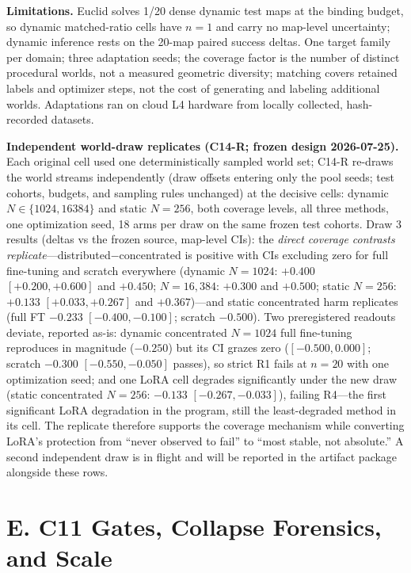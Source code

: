 \documentclass[letterpaper]{article} %
\newcommand{\stage}[1]{\textsc{#1}}
\begin{document}
\textbf{Limitations.} Euclid solves 1/20 dense dynamic test maps at the binding budget, so dynamic matched-ratio cells have $n{=}1$ and carry no map-level uncertainty; dynamic inference rests on the 20-map paired success deltas. One target family per domain; three adaptation seeds; the coverage factor is the number of distinct procedural worlds, not a measured geometric diversity; matching covers retained labels and optimizer steps, not the cost of generating and labeling additional worlds. Adaptations ran on cloud L4 hardware from locally collected, hash-recorded datasets.

\textbf{Independent world-draw replicates (C14-R; frozen design 2026-07-25).} Each original cell used one deterministically sampled world set; C14-R re-draws the world streams independently (draw offsets entering only the pool seeds; test cohorts, budgets, and sampling rules unchanged) at the decisive cells: dynamic $N \in \{1024, 16384\}$ and static $N{=}256$, both coverage levels, all three methods, one optimization seed, 18 arms per draw on the same frozen test cohorts. Draw 3 results (deltas vs the frozen source, map-level CIs): the \emph{direct coverage contrasts replicate}---distributed$-$concentrated is positive with CIs excluding zero for full fine-tuning and scratch everywhere (dynamic $N{=}1024$: $+0.400$ $[+0.200,+0.600]$ and $+0.450$; $N{=}16{,}384$: $+0.300$ and $+0.500$; static $N{=}256$: $+0.133$ $[+0.033,+0.267]$ and $+0.367$)---and static concentrated harm replicates (full FT $-0.233$ $[-0.400,-0.100]$; scratch $-0.500$). Two preregistered readouts deviate, reported as-is: dynamic concentrated $N{=}1024$ full fine-tuning reproduces in magnitude ($-0.250$) but its CI grazes zero ($[-0.500, 0.000]$; scratch $-0.300$ $[-0.550,-0.050]$ passes), so strict R1 fails at $n{=}20$ with one optimization seed; and one LoRA cell degrades significantly under the new draw (static concentrated $N{=}256$: $-0.133$ $[-0.267,-0.033]$), failing R4---the first significant LoRA degradation in the program, still the least-degraded method in its cell. The replicate therefore supports the coverage mechanism while converting LoRA's protection from ``never observed to fail'' to ``most stable, not absolute.'' A second independent draw is in flight and will be reported in the artifact package alongside these rows.

\section{E. \stage{C11} Gates, Collapse Forensics, and Scale}
\end{document}
